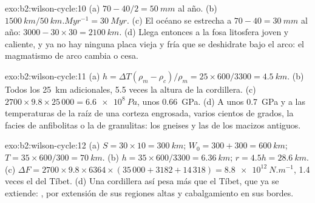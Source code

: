 \begin{solution}{exo:b2:wilson-cycle:10}
(a) $70 - 40/2 = \qty{50}{mm}$ al año. (b) $\qty{1500}{km}/\qty{50}{km.Myr^{-1}} =
\qty{30}{Myr}$. (c) El océano se estrecha a $70 - 40 = \qty{30}{mm}$ al año: $3000 - 30\times30 =
\qty{2100}{km}$. (d) Llega entonces a la fosa litosfera joven y caliente, y ya no hay ninguna placa vieja y fría que
se deshidrate bajo el arco: el magmatismo de arco cambia o cesa.
\end{solution}

\begin{solution}{exo:b2:wilson-cycle:11}
(a) $h = \Delta T(\rho_m - \rho_c)/\rho_m = 25\times600/3300 = \qty{4.5}{km}$. (b) Todos los
\qty{25}{km} adicionales, 5.5 veces la altura de la cordillera. (c) $2700\times9.8\times25\,000 =
\qty{6.6e8}{Pa}$, unos \qty{0.66}{GPa}. (d) A unos \qty{0.7}{GPa} y a las temperaturas de
la raíz de una corteza engrosada, varios cientos de grados, la facies de anfibolitas o la de
granulitas: los gneises y las  de los macizos antiguos.
\end{solution}

\begin{solution}{exo:b2:wilson-cycle:12}
(a) $S = 30\times10 = \qty{300}{km}$; $W_0 = 300 + 300 = \qty{600}{km}$; $T = 35\times600/300 =
\qty{70}{km}$. (b) $h = 35\times600/3300 = \qty{6.36}{km}$; $r = 4.5h = \qty{28.6}{km}$.
(c) $\Delta F = 2700\times9.8\times6364\times(35\,000 + 3182 + 14\,318) =
\qty{8.8e12}{N.m^{-1}}$, 1.4 veces el del Tíbet. (d) Una cordillera así pesa más que el Tíbet, que ya
se extiende: , por extensión de sus regiones altas y cabalgamiento en sus bordes.
\end{solution}

